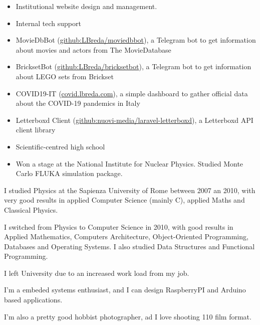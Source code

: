 \documentclass[10pt,a4paper]{altacv}
\begin{document}
\divider

\begin{itemize}
\item Institutional website design and management.
\item Internal tech support
\end{itemize}

\pagebreak

\begin{itemize}
\item MovieDbBot (\href{https://github.com/LBreda/moviedbbot}{github:LBreda/moviedbbot}), a Telegram bot to get information about movies and actors from The MovieDatabase
\item BricksetBot (\href{https://github.com/LBreda/bricksetbot}{github:LBreda/bricksetbot}), a Telegram bot to get information about LEGO sets from Brickset
\item COVID19-IT (\href{https://covid19.lbreda.com/}{covid.lbreda.com}), a simple dashboard to gather official data about the COVID-19 pandemics in Italy
\item Letterboxd Client (\href{https://github.com/nuovi-media/laravel-letterboxd}{github:nuovi-media/laravel-letterboxd}), a Letterboxd API client library
\end{itemize}


\begin{itemize}
\item Scientific-centred high school
\item Won a stage at the National Institute for Nuclear Physics. Studied Monte Carlo FLUKA simulation package.
\end{itemize}

I studied Physics at the Sapienza University of Rome between 2007 an 2010, with very good results in applied Computer Science (mainly C), applied Maths and Classical Physics.

\smallskip

I switched from Physics to Computer Science in 2010, with good results in Applied Mathematics, Computers Architecture, Object-Oriented Programming, Databases and Operating Systems. I also studied Data Structures and Functional Programming.

\smallskip

I left University due to an increased work load from my job.

I'm a embeded systems enthusiast, and I can design RaspberryPI and Arduino based applications.

\smallskip

I'm also a pretty good hobbist photographer, ad I love shooting 110 film format.
\end{document}
